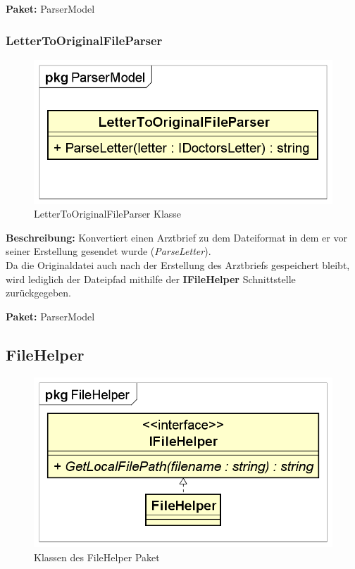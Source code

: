 \documentclass[a4paper]{scrreprt}
\begin{document}
\textbf{Paket:} ParserModel

\subsubsection{LetterToOriginalFileParser}
\begin{figure}[H]
\centering
\includegraphics[width=0.45\textheight]{graphics/Klassendiagramme/Model/LetterToOriginalFileParser.png}
\caption{LetterToOriginalFileParser Klasse}
\end{figure}
\textbf{Beschreibung:} Konvertiert einen Arztbrief zu dem Dateiformat in dem er vor seiner Erstellung gesendet wurde (\textit{ParseLetter}).\\
Da die Originaldatei auch nach der Erstellung des Arztbriefs gespeichert bleibt, wird lediglich der Dateipfad mithilfe der \textbf{IFileHelper} Schnittstelle zurückgegeben.

\textbf{Paket:} ParserModel

\subsection{FileHelper}
\begin{figure}[H]
\centering
\includegraphics[width=0.55\textheight]{graphics/Klassendiagramme/Model/FileHelperPackage.png}
\caption{Klassen des FileHelper Paket}
\end{figure}
\end{document}
